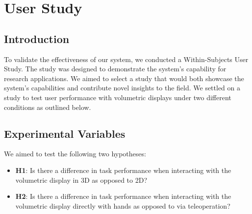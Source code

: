 \section{User Study}
\subsection{Introduction}

To validate the effectiveness of our system, we conducted a Within-Subjects User Study. The study was designed to demonstrate the system's capability for research applications. We aimed to select a study that would both showcase the system's capabilities and contribute novel insights to the field. We settled on a study to test user performance with volumetric displays under two different conditions as outlined below.

\subsection{Experimental Variables}

We aimed to test the following two hypotheses:
\begin{itemize}
    \item \textbf{H1}: Is there a difference in task performance when interacting with the volumetric display in 3D as opposed to 2D?
    \item \textbf{H2}: Is there a difference in task performance when interacting with the volumetric display directly with hands as opposed to via teleoperation?
\end{itemize}

